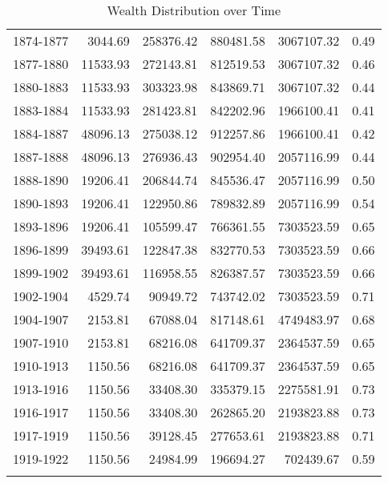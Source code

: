 \begin{table}[ht]
\begin{tabular}{lrrrrr}
  1874-1877 & 3044.69 & 258376.42 & 880481.58 & 3067107.32 & 0.49 \\ 
  1877-1880 & 11533.93 & 272143.81 & 812519.53 & 3067107.32 & 0.46 \\ 
  1880-1883 & 11533.93 & 303323.98 & 843869.71 & 3067107.32 & 0.44 \\ 
  1883-1884 & 11533.93 & 281423.81 & 842202.96 & 1966100.41 & 0.41 \\ 
  1884-1887 & 48096.13 & 275038.12 & 912257.86 & 1966100.41 & 0.42 \\ 
  1887-1888 & 48096.13 & 276936.43 & 902954.40 & 2057116.99 & 0.44 \\ 
  1888-1890 & 19206.41 & 206844.74 & 845536.47 & 2057116.99 & 0.50 \\ 
  1890-1893 & 19206.41 & 122950.86 & 789832.89 & 2057116.99 & 0.54 \\ 
  1893-1896 & 19206.41 & 105599.47 & 766361.55 & 7303523.59 & 0.65 \\ 
  1896-1899 & 39493.61 & 122847.38 & 832770.53 & 7303523.59 & 0.66 \\ 
  1899-1902 & 39493.61 & 116958.55 & 826387.57 & 7303523.59 & 0.66 \\ 
  1902-1904 & 4529.74 & 90949.72 & 743742.02 & 7303523.59 & 0.71 \\ 
  1904-1907 & 2153.81 & 67088.04 & 817148.61 & 4749483.97 & 0.68 \\ 
  1907-1910 & 2153.81 & 68216.08 & 641709.37 & 2364537.59 & 0.65 \\ 
  1910-1913 & 1150.56 & 68216.08 & 641709.37 & 2364537.59 & 0.65 \\ 
  1913-1916 & 1150.56 & 33408.30 & 335379.15 & 2275581.91 & 0.73 \\ 
  1916-1917 & 1150.56 & 33408.30 & 262865.20 & 2193823.88 & 0.73 \\ 
  1917-1919 & 1150.56 & 39128.45 & 277653.61 & 2193823.88 & 0.71 \\ 
  1919-1922 & 1150.56 & 24984.99 & 196694.27 & 702439.67 & 0.59 \\ 
   \hline
\multicolumn{6}{l}{}\\
\end{tabular}
\caption{Wealth Distribution over Time} 
\label{tab:ginicoef}
\end{table}
